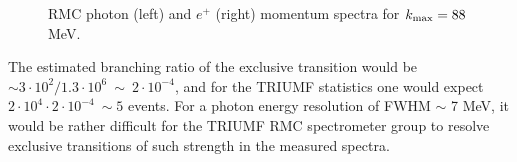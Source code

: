 \documentclass[12pt]{article}
\newcommand {\kmax}      {k_{\rm max}}
\begin{document}
\begin{figure}
  \hspace*{-1.3cm}%
  \caption {
    \label{fig:rmc_photon_and_positron_spectra}
    RMC photon (left) and $e^+$ (right) momentum spectra for $\kmax = 88$ MeV.
  }
\end{figure}


The estimated branching ratio of the exclusive transition would be 
$\sim 3\cdot 10^2/1.3\cdot 10^6 ~ \sim ~ 2\cdot 10^{-4}$, and for the TRIUMF statistics one would expect
$2\cdot 10^4\cdot 2\cdot 10^{-4} ~\sim 5$ events. For a photon energy resolution of FWHM $\sim$ 7 MeV,
it would be rather difficult for the TRIUMF RMC spectrometer group to resolve exclusive
transitions of such strength in the measured spectra. 
\end{document}
